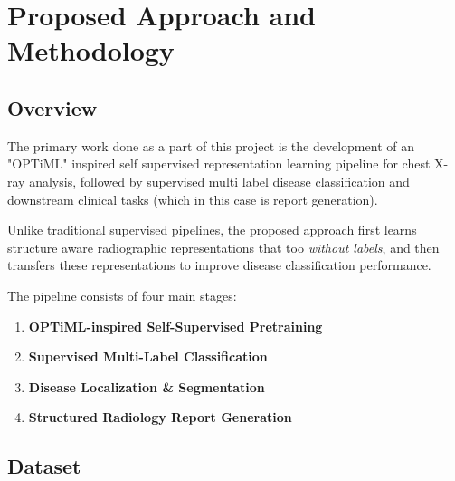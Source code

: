 
\chapter{Proposed Approach and Methodology}
\label{chap:methodology}

\section*{Overview}

The primary work done as a part of this project is the development of an "OPTiML" inspired self supervised representation learning pipeline for chest X-ray analysis, followed by supervised multi label disease classification and downstream clinical tasks (which in this case is report generation).

Unlike traditional supervised pipelines, the proposed approach first learns structure aware radiographic representations that too \emph{without labels}, and then transfers these representations to improve disease classification performance.

The pipeline consists of four main stages:
\begin{enumerate}
    \item \textbf{OPTiML-inspired Self-Supervised Pretraining}
    \item \textbf{Supervised Multi-Label Classification}
    \item \textbf{Disease Localization \& Segmentation} 
    \item \textbf{Structured Radiology Report Generation}
\end{enumerate}


\section{Dataset}

